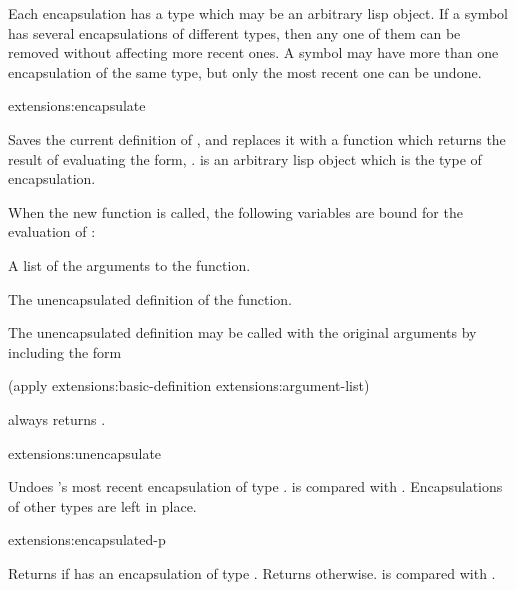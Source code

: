 Each encapsulation has a type which may be an arbitrary lisp object.
If a symbol has several encapsulations of different types, then any
one of them can be removed without affecting more recent ones.
A symbol may have more than one encapsulation of the same type, but
only the most recent one can be undone.

\begin{defun}{extensions:}{encapsulate}{%
    }
  
  Saves the current definition of , and replaces it with a
  function which returns the result of evaluating the form,
  .   is an arbitrary lisp object which is the
  type of encapsulation.
  
  When the new function is called, the following variables are bound
  for the evaluation of :
  \begin{Lentry}
    
  \item[\code{extensions:argument-list}] A list of the arguments to
    the function.
    
  \item[\code{extensions:basic-definition}] The unencapsulated
    definition of the function.
  \end{Lentry}
  The unencapsulated definition may be called with the original
  arguments by including the form
  \begin{lisp}
    (apply extensions:basic-definition extensions:argument-list)
  \end{lisp}

   always returns .
\end{defun}

\begin{defun}{extensions:}{unencapsulate}{}
  
  Undoes 's most recent encapsulation of type .
   is compared with .  Encapsulations of other
  types are left in place.
\end{defun}

\begin{defun}{extensions:}{encapsulated-p}{%
    }
  
  Returns \true{} if  has an encapsulation of type
  .  Returns \nil{} otherwise.   is compared with
  .
\end{defun}

